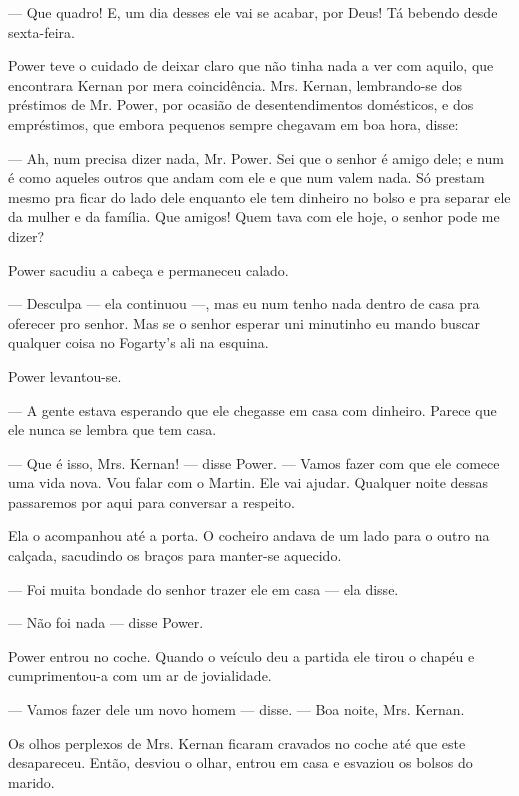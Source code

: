 --- Que quadro! E, um dia desses ele vai se acabar, por Deus! Tá
bebendo desde sexta-feira.

Power teve o cuidado de deixar claro que não tinha nada a ver com
aquilo, que encontrara Kernan por mera coincidência. Mrs. Kernan,
lembrando-se dos préstimos de Mr. Power, por ocasião de
desentendimentos domésticos, e dos empréstimos, que embora pequenos
sempre chegavam em boa hora, disse:

 --- Ah, num precisa dizer nada, Mr. Power. Sei que o senhor é
amigo dele; e num é como aqueles outros que andam com ele e
que num valem nada. Só prestam mesmo pra ficar do lado dele
enquanto ele tem dinheiro no bolso e pra separar ele da mulher e
da família. Que amigos! Quem tava com ele hoje, o senhor pode me
dizer?

Power sacudiu a cabeça e permaneceu calado.

--- Desculpa --- ela continuou ---, mas eu num tenho nada dentro de
casa pra oferecer pro senhor. Mas se o senhor esperar uni minutinho eu
mando buscar qualquer coisa no Fogarty's ali na esquina.

Power levantou-se.

--- A gente estava esperando que ele chegasse em casa com dinheiro.
Parece que ele nunca se lembra que tem casa.

--- Que é isso, Mrs. Kernan! --- disse Power. --- Vamos fazer com que
ele comece uma vida nova. Vou falar com o Martin. Ele vai ajudar.
Qualquer noite dessas passaremos por aqui para conversar a respeito.

Ela o acompanhou até a porta. O cocheiro andava de um lado para o
outro na calçada, sacudindo os braços para manter-se aquecido.

--- Foi muita bondade do senhor trazer ele em casa --- ela disse.

--- Não foi nada --- disse Power.

Power entrou no coche. Quando o veículo deu a partida ele tirou o
chapéu e cumprimentou-a com um ar de jovialidade.

--- Vamos fazer dele um novo homem --- disse. --- Boa noite, Mrs.
Kernan.

\dotfill\hspace{.7\textwidth}

Os olhos perplexos de Mrs. Kernan ficaram cravados no coche até que
este desapareceu. Então, desviou o olhar, entrou em casa e esvaziou os
bolsos do marido.


